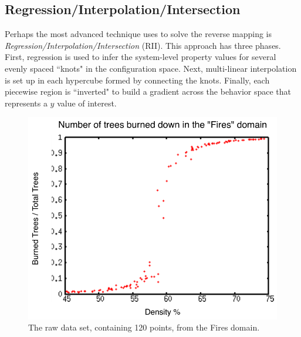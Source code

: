 \subsection{Regression/Interpolation/Intersection}

Perhaps the most advanced technique \fw uses to solve the reverse mapping is \textit{Regression/Interpolation/Intersection} (RII).
This approach has three phases.
First, regression is used to infer the system-level property values for several evenly spaced ``knots" in the configuration space.
Next, multi-linear interpolation is set up in each hypercube formed by connecting the knots.
Finally, each piecewise region is ``inverted" to build a gradient across the behavior space that represents a $y$ value of interest.

\begin{figure}[ht]
\centering
\includegraphics[scale=.66666667]{images/rii0.pdf}
\caption{The raw data set, containing 120 points, from the Fires domain.}
\label{fig:rii0}
\end{figure}

